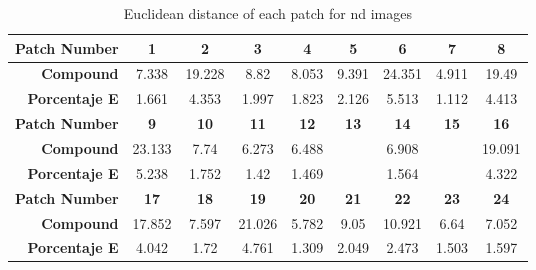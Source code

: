 \begin{table}[H]
  \caption{Euclidean distance of each patch for nd images }
  \begin{center}
    \begin{tabularx}{\textwidth}{r c c c c c c c c}
    \toprule
        \textbf{Patch Number} & \textbf{1} & \textbf{2} & \textbf{3} & \textbf{4} & \textbf{5} & \textbf{6} & \textbf{7} & \textbf{8}\\ \midrule 
        \textbf{Compound} &7.338 &19.228 &8.82 &8.053 &9.391 &24.351 &4.911 &19.49\\ 
        \textbf{Porcentaje E} &1.661 &4.353 &1.997 &1.823 &2.126 &5.513 &1.112 &4.413\\ \midrule 
        \textbf{Patch Number} & \textbf{9} & \textbf{10} & \textbf{11} & \textbf{12} & \textbf{13} & \textbf{14} & \textbf{15} & \textbf{16}\\ \midrule 
        \textbf{Compound} &23.133 &7.74 &6.273 &6.488 &\cellcolor{colorgreen}{4.607} &6.908 &\cellcolor{colorred}{29.981} &19.091\\ 
        \textbf{Porcentaje E} &5.238 &1.752 &1.42 &1.469 &\cellcolor{colorgreen}{1.043} &1.564 &\cellcolor{colorred}{6.788} &4.322\\ \midrule 
        \textbf{Patch Number} & \textbf{17} & \textbf{18} & \textbf{19} & \textbf{20} & \textbf{21} & \textbf{22} & \textbf{23} & \textbf{24}\\ \midrule 
        \textbf{Compound} &17.852 &7.597 &21.026 &5.782 &9.05 &10.921 &6.64 &7.052\\ 
        \textbf{Porcentaje E} &4.042 &1.72 &4.761 &1.309 &2.049 &2.473 &1.503 &1.597\\ \midrule 
    \bottomrule
    \end{tabularx}
  \end{center}
\end{table}
